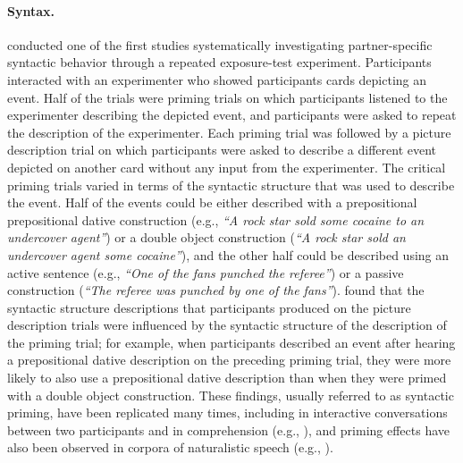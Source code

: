 \paragraph{Syntax.} \cite{Bock1986} conducted one of the first studies systematically investigating partner-specific syntactic behavior through a repeated
exposure-test experiment. Participants interacted with an experimenter who showed participants cards depicting an event.  Half of the trials were priming trials on which
 participants listened to the experimenter describing the depicted event, and participants were asked to repeat the description of the experimenter. 
 Each priming trial was followed by a picture description trial on which participants were asked to describe a different event depicted on another card without any input from the experimenter.
The critical priming trials varied in terms of the syntactic structure that was used to describe the event. Half of the events could be either described with a prepositional
 prepositional dative construction (e.g., \textit{``A rock star
sold some cocaine to an undercover agent''})  or a double object construction (\textit{``A rock star sold an undercover agent some cocaine''}), and the other half could be
described using an active sentence (e.g., \textit{``One of the fans punched the referee''}) or a passive construction (\textit{``The referee was punched by one of the fans''}).
\cite{Bock1986} found that the syntactic structure descriptions that participants produced on the picture description trials were influenced by the syntactic structure of the description
of the priming trial; for example, when participants described an event after hearing a prepositional dative description on the preceding priming trial, they were more likely to also 
use a prepositional dative description than when they were primed with a double object construction. These findings, usually referred to as syntactic priming, have been 
replicated many times, including in interactive conversations between two participants \cite{BrenniganPickering1998} and in comprehension (e.g., \cite{Traxler2008}), 
and priming effects have also been observed in corpora of naturalistic speech (e.g., \cite{Gries2005}). 

